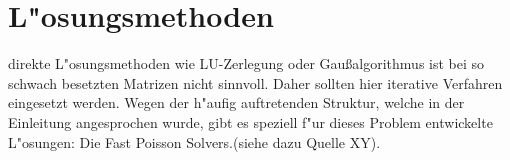 \section{L"osungsmethoden}
direkte L"osungsmethoden wie LU-Zerlegung oder Gaußalgorithmus ist bei so schwach besetzten Matrizen nicht sinnvoll. Daher sollten hier iterative Verfahren eingesetzt werden. Wegen der h"aufig auftretenden Struktur, welche in der Einleitung angesprochen wurde, gibt es speziell f"ur dieses Problem entwickelte L"osungen: Die \glqq Fast Poisson Solvers\grqq .(siehe dazu Quelle XY).
 
